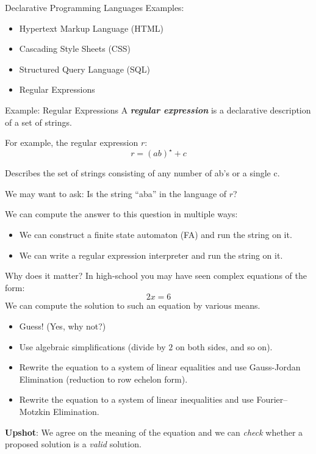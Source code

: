 \begin{frame}{Declarative Programming Languages}
Examples:

\begin{itemize}
    \item Hypertext Markup Language (HTML)
    \item Cascading Style Sheets (CSS)
    \item Structured Query Language (SQL)
    \item Regular Expressions
\end{itemize}
\end{frame}

\begin{frame}{Example: Regular Expressions}
A \textbf{\emph{regular expression}} is a declarative description of a set of strings.

For example, the regular expression $r$: 
%
$$
r = (ab)^\star + c
$$

Describes the set of strings consisting of any number of ab's or a single c.

\pause

We may want to ask: Is the string ``aba'' in the language of $r$?

We can compute the answer to this question in multiple ways:

\begin{itemize}
    \item We can construct a finite state automaton (FA) and run the string on it.
    \item We can write a regular expression interpreter and run the string on it.
\end{itemize}
\end{frame}

\begin{frame}{Why does it matter?}
In high-school you may have seen complex equations of the form:
\[
    2x = 6
\]
We can compute the solution to such an equation by various means.

\pause

\begin{itemize}
    \item Guess! (Yes, why not?) 
    \pause \item Use algebraic simplifications (divide by $2$ on both sides, and so on).
    \pause \item Rewrite the equation to a system of linear equalities and use
    Gauss-Jordan Elimination (reduction to row echelon form).
    \pause \item Rewrite the equation to a system of linear inequalities and use
    Fourier--Motzkin Elimination.
\end{itemize}

\pause

\textbf{Upshot}: We agree on the meaning of the equation and we can \emph{check}
whether a proposed solution is a \emph{valid} solution.
\end{frame}

